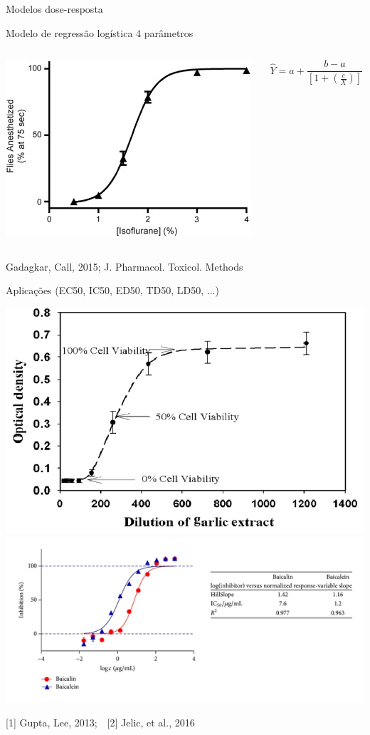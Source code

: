 \documentclass{beamer}
\begin{document}
\begin{frame}{\scriptsize Modelos dose-resposta}
  \begin{block}{\scriptsize Modelo de regressão logística 4 parâmetros}
    \begin{columns}
      \begin{column}{5cm}
        \begin{center}
          \includegraphics[width=.5\textwidth]{Cap18-19/Dose-response-Hill-eq}
        \end{center}
      \end{column}
      \begin{column}{5cm}
        \tiny

        $$\hat{Y} = a + \frac{b-a}{\left[ 1 + \left(\frac{c}{X}\right)\right]}$$
      \end{column}
    \end{columns}
    {\hfill \tiny Gadagkar, Call, 2015; J. Pharmacol. Toxicol. Methods}
  \end{block}
  \begin{block}{\scriptsize Aplicações (EC50, IC50, ED50, TD50, LD50, ...)}
    \begin{center}
      \includegraphics[width=.35\textwidth]{Cap18-19/Dose-response-curve-of-aqueous-garlic-extract-on-viability-of-Mus-musculus-colon}
      \includegraphics[height=.3\textheight]{Cap18-19/Dose-response-curves-and-IC50-values-of-Src-kinase-inhibition-for-baicalin-and-baicalein}
    \end{center}
    {\hfill \tiny [1] Gupta, Lee, 2013;\ \ [2] Jelic, et al., 2016}
  \end{block}
\end{frame}
\end{document}

